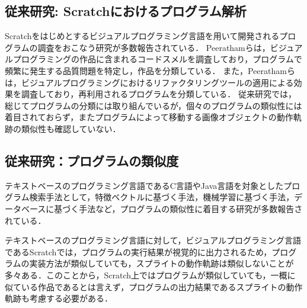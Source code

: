 \documentclass[T,J]{fose} %
\newcommand{\todo}[1]{\colorbox{yellow}{{\bf TODO}:}{\color{red} {\textbf{[#1]}}}}
\begin{document}
\subsection{従来研究: Scratchにおけるプログラム解析}\label{subsec:analyze-scratch}

Scratchをはじめとするビジュアルプログラミング言語を用いて開発されるプログラムの調査をおこなう研究が多数報告されている．
Peeratham\cite{Understanding}らは，ビジュアルプログラミングの作品に含まれるコードスメルを調査しており，プログラムで頻繁に発生する品質問題を特定し，作品を分類している．
また，Peeratham\cite{techapalokul2019code}らは，ビジュアルプログラミングにおけるリファクタリングツールの適用による効果を調査しており，再利用されるプログラムを分類している．
従来研究では，総じてプログラムの分類には取り組んでいるが，個々のプログラムの類似性には着目されておらず，またプログラムによって移動する画像オブジェクトの動作軌跡の類似性も確認していない．

\subsection{従来研究：プログラムの類似度}\label{subsec:similarity of scratch}
テキストベースのプログラミング言語であるC言語やJava言語を対象としたプログラム検索手法として，特徴ベクトルに基づく手法，機械学習に基づく手法，データベースに基づく手法など，プログラムの類似性に着目する研究が多数報告されている\cite{}．

テキストベースのプログラミング言語に対して，ビジュアルプログラミング言語であるScratchでは，プログラムの実行結果が視覚的に出力されるため，プログラムの実装方法が類似していても，スプライトの動作軌跡は類似しないことが多々ある．このことから，Scratch上ではプログラムが類似していても，一概に似ている作品であるとは言えず，プログラムの出力結果であるスプライトの動作軌跡も考慮する必要がある．

\end{document}
